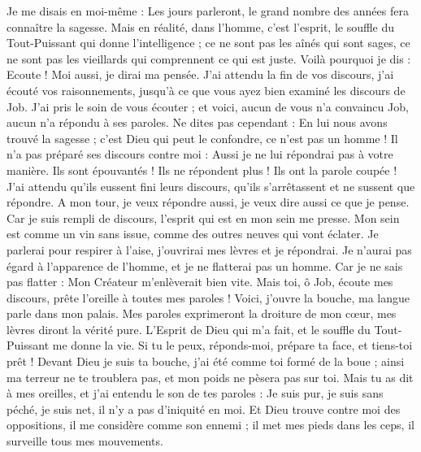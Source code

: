 \begin{multicols}{2}
Je me disais en moi-même : Les jours parleront, le grand nombre des années fera connaître la sagesse.
Mais en réalité, dans l'homme, c'est l'esprit, le souffle du Tout-Puissant qui donne l'intelligence ;
ce ne sont pas les aînés qui sont sages, ce ne sont pas les vieillards qui comprennent ce qui est juste.
Voilà pourquoi je dis : Ecoute ! Moi aussi, je dirai ma pensée.
J'ai attendu la fin de vos discours, j'ai écouté vos raisonnements, jusqu'à ce que vous ayez bien examiné les discours de Job.
J'ai pris le soin de vous écouter ; et voici, aucun de vous n'a convaincu Job, aucun n'a répondu à ses paroles.
Ne dites pas cependant : En lui nous avons trouvé la sagesse ; c'est Dieu qui peut le confondre, ce n'est pas un homme !
Il n'a pas préparé ses discours contre moi : Aussi je ne lui répondrai pas à votre manière.
Ils sont épouvantés ! Ils ne répondent plus ! Ils ont la parole coupée !
J'ai attendu qu'ils eussent fini leurs discours, qu'ils s'arrêtassent et ne sussent que répondre.
A mon tour, je veux répondre aussi, je veux dire aussi ce que je pense.
Car je suis rempli de discours, l'esprit qui est en mon sein me presse.
Mon sein est comme un vin sans issue, comme des outres neuves qui vont éclater.
Je parlerai pour respirer à l'aise, j'ouvrirai mes lèvres et je répondrai.
Je n'aurai pas égard à l'apparence de l'homme, et je ne flatterai pas un homme.
Car je ne sais pas flatter : Mon Créateur m'enlèverait bien vite.
\VerseOne{}Mais toi, ô Job, écoute mes discours, prête l'oreille à toutes mes paroles !
Voici, j'ouvre la bouche, ma langue parle dans mon palais.
Mes paroles exprimeront la droiture de mon cœur, mes lèvres diront la vérité pure.
L'Esprit de Dieu qui m'a fait, et le souffle du Tout-Puissant me donne la vie.
Si tu le peux, réponds-moi, prépare ta face, et tiens-toi prêt !
Devant Dieu je suis ta bouche, j'ai été comme toi formé de la boue ;
ainsi ma terreur ne te troublera pas, et mon poids ne pèsera pas sur toi.
Mais tu as dit à mes oreilles, et j'ai entendu le son de tes paroles :
Je suis pur, je suis sans péché, je suis net, il n'y a pas d'iniquité en moi.
Et Dieu trouve contre moi des oppositions, il me considère comme son ennemi ;
il met mes pieds dans les ceps, il surveille tous mes mouvements.

\end{multicols}
